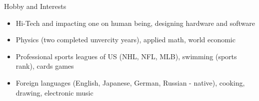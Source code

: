 \documentclass{resume}
\begin{document}

\begin{rSection}{Hobby and Interests}

\begin{itemize}
\item Hi-Tech and impacting one on human being, designing hardware and software
\item Physics (two completed unvercity years), applied math, world economic
\item Professional sports leagues of US (NHL, NFL, MLB), swimming (sports rank), cards games
\item Foreign languages (English, Japanese, German, Russian - native), cooking, drawing, electronic music
\end{itemize}

\end{rSection}

\end{document}
